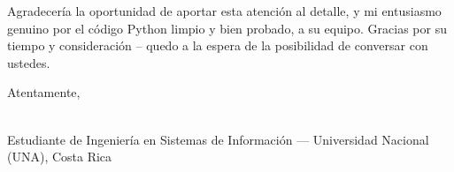 \documentclass[11pt]{article}
\begin{document}
Agradecer\'ia la oportunidad de aportar esta atenci\'on al detalle, y mi entusiasmo genuino
por el c\'odigo Python limpio y bien probado, a su equipo. Gracias por su tiempo y
consideraci\'on -- quedo a la espera de la posibilidad de conversar con ustedes.

\vspace{8pt}
Atentamente,

\vspace{16pt}
{\color{cvprimary}\bfseries \MyName}\\
{\color{cvlight}\small Estudiante de Ingenier\'ia en Sistemas de Informaci\'on --- Universidad Nacional (UNA), Costa Rica}
\end{document}
